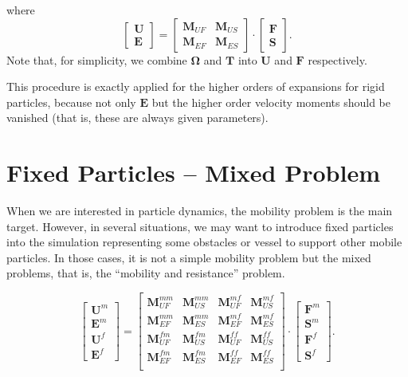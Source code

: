 \documentclass{book}
\begin{document}
where
\begin{equation}
  \left[
    \begin{array}{c}
      \bm{U}\\
      \bm{E}
    \end{array}
  \right]
  =
  \left[
    \begin{array}{cc}
      \bm{M}_{UF} & \bm{M}_{US}\\
      \bm{M}_{EF} & \bm{M}_{ES}
    \end{array}
  \right]
  \cdot
  \left[
    \begin{array}{c}
      \bm{F}\\
      \bm{S}
    \end{array}
  \right]
  .
\end{equation}
Note that, for simplicity, we combine $\bm{\Omega}$ and $\bm{T}$ into
$\bm{U}$ and $\bm{F}$ respectively.


This procedure is exactly applied for the higher orders
of expansions for rigid particles, because not only $\bm{E}$
but the higher order velocity moments should be vanished
(that is, these are always given parameters).


\section{Fixed Particles -- Mixed Problem}
When we are interested in particle dynamics,
the mobility problem is the main target.
However, in several situations, we may want to introduce
fixed particles into the simulation representing some
obstacles or vessel to support other mobile particles.
\cite{ichiki1995}
In those cases, it is not a simple mobility problem but
the mixed problems, that is,
the ``mobility and resistance'' problem.

\begin{equation}
  \left[
    \begin{array}{c}
      \bm{U}^{m}\\
      \bm{E}^{m}\\
      \bm{U}^{f}\\
      \bm{E}^{f}
    \end{array}
  \right]
  =
  \left[
    \begin{array}{cccc}
      \bm{M}_{UF}^{mm} & \bm{M}_{US}^{mm} & \bm{M}_{UF}^{mf} & \bm{M}_{US}^{mf}\\
      \bm{M}_{EF}^{mm} & \bm{M}_{ES}^{mm} & \bm{M}_{EF}^{mf} & \bm{M}_{ES}^{mf}\\
      \bm{M}_{UF}^{fm} & \bm{M}_{US}^{fm} & \bm{M}_{UF}^{ff} & \bm{M}_{US}^{ff}\\
      \bm{M}_{EF}^{fm} & \bm{M}_{ES}^{fm} & \bm{M}_{EF}^{ff} & \bm{M}_{ES}^{ff}\\
    \end{array}
  \right]
  \cdot
  \left[
    \begin{array}{c}
      \bm{F}^{m}\\
      \bm{S}^{m}\\
      \bm{F}^{f}\\
      \bm{S}^{f}
    \end{array}
  \right]
  .
\end{equation}
\end{document}
